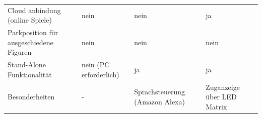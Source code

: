 \begin{longtable}[]{@{}llll@{}}
\begin{minipage}[t]{0.20\columnwidth}
Cloud anbindung (online Spiele)\strut
\end{minipage} & \begin{minipage}[t]{0.24\columnwidth}\raggedright
nein\strut
\end{minipage} & \begin{minipage}[t]{0.26\columnwidth}\raggedright
nein\strut
\end{minipage} & \begin{minipage}[t]{0.19\columnwidth}\raggedright
ja\strut
\end{minipage}\tabularnewline
\begin{minipage}[t]{0.20\columnwidth}\raggedright
Parkposition für ausgeschiedene Figuren\strut
\end{minipage} & \begin{minipage}[t]{0.24\columnwidth}\raggedright
nein\strut
\end{minipage} & \begin{minipage}[t]{0.26\columnwidth}\raggedright
nein\strut
\end{minipage} & \begin{minipage}[t]{0.19\columnwidth}\raggedright
nein\strut
\end{minipage}\tabularnewline
\begin{minipage}[t]{0.20\columnwidth}\raggedright
Stand-Alone Funktionalität\strut
\end{minipage} & \begin{minipage}[t]{0.24\columnwidth}\raggedright
nein (PC erforderlich)\strut
\end{minipage} & \begin{minipage}[t]{0.26\columnwidth}\raggedright
ja\strut
\end{minipage} & \begin{minipage}[t]{0.19\columnwidth}\raggedright
ja\strut
\end{minipage}\tabularnewline
\begin{minipage}[t]{0.20\columnwidth}\raggedright
Besonderheiten\strut
\end{minipage} & \begin{minipage}[t]{0.24\columnwidth}\raggedright
-\strut
\end{minipage} & \begin{minipage}[t]{0.26\columnwidth}\raggedright
Sprachsteuerung (Amazon Alexa)\strut
\end{minipage} & \begin{minipage}[t]{0.19\columnwidth}\raggedright
Zuganzeige über LED Matrix\strut
\end{minipage}\tabularnewline

\end{longtable}
